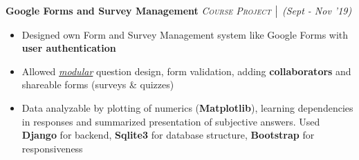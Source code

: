 \documentclass{article}
\begin{document}
\vspace{-5pt}
\textbf{Google Forms and Survey Management} \hfill{\sl \small \textsc{Course Project} $\bigm|$ (Sept - Nov '19)}
\vspace{-7pt}
\begin{itemize}[itemsep = -1.5 mm, leftmargin=*]
    \item Designed own Form and Survey Management system like Google Forms with \textbf{user authentication}
    \item Allowed \textit{\underline{modular}} question design, form validation, adding \textbf{collaborators} and shareable forms (surveys \& quizzes)
    \item Data analyzable by plotting of numerics (\textbf{Matplotlib}), learning dependencies in responses and summarized presentation of subjective answers. Used \textbf{Django} for backend, \textbf{Sqlite3} for database structure, \textbf{Bootstrap} for responsiveness
\end{itemize}

\end{document}
